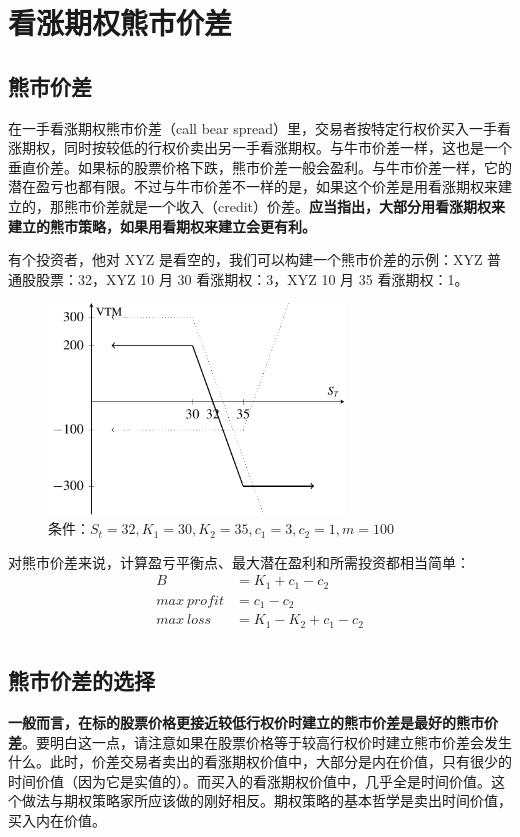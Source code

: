 \chapter{看涨期权熊市价差}
\section{熊市价差}
在一手看涨期权熊市价差（call bear spread）里，交易者按特定行权价买入一手看涨期权，同时按较低的行权价卖出另一手看涨期权。与牛市价差一样，这也是一个垂直价差。如果标的股票价格下跌，熊市价差一般会盈利。与牛市价差一样，它的潜在盈亏也都有限。不过与牛市价差不一样的是，如果这个价差是用看涨期权来建立的，那熊市价差就是一个收入（credit）价差。\textbf{应当指出，大部分用看涨期权来建立的熊市策略，如果用看期权来建立会更有利。}

有个投资者，他对 XYZ 是看空的，我们可以构建一个熊市价差的示例：XYZ 普通股股票：32，XYZ 10 月 30 看涨期权：3，XYZ 10 月 35 看涨期权：1。

\begin{figure}[h]
    \centering
    \includegraphics[width=0.7\textwidth]{IMG/Bear spread.pdf}
    \caption{条件：$S_t=32, K_1=30, K_2=35, c_1=3, c_2=1, m=100$}
    \label{fig:bear_spread_using_call_1}
\end{figure}

对熊市价差来说，计算盈亏平衡点、最大潜在盈利和所需投资都相当简单：
\begin{equation}
    \begin{aligned}
        B          & =K_1+c_1-c_2     \\
        max~profit & =c_1-c_2         \\
        max~loss   & =K_1-K_2+c_1-c_2 \\
    \end{aligned}
\end{equation}
\section{熊市价差的选择}
\textbf{一般而言，在标的股票价格更接近较低行权价时建立的熊市价差是最好的熊市价差}。要明白这一点，请注意如果在股票价格等于较高行权价时建立熊市价差会发生什么。此时，价差交易者卖出的看涨期权价值中，大部分是内在价值，只有很少的时间价值（因为它是实值的）。而买入的看涨期权价值中，几乎全是时间价值。这个做法与期权策略家所应该做的刚好相反。期权策略的基本哲学是卖出时间价值，买入内在价值。
